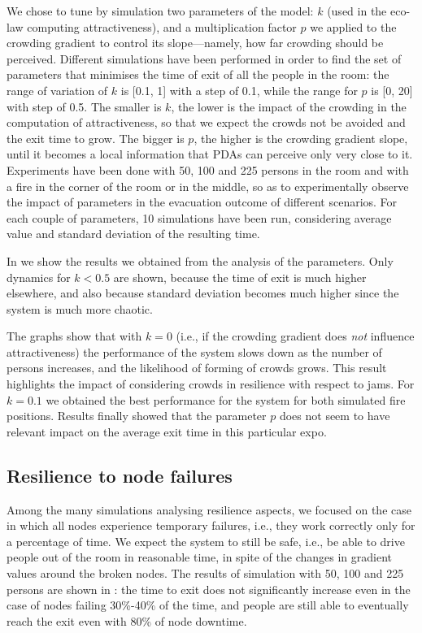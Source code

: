 \documentclass[12pt,a4paper,twoside,openright]{book}
\begin{document}
We chose to tune by simulation two parameters of the model: $k$ (used in the eco-law computing attractiveness), and a multiplication factor $p$ we applied to the crowding gradient to control its slope---namely, how far crowding should be perceived.
%
Different simulations have been performed in order to find the set of parameters that minimises the time of exit of all the people in the room: the range of variation of $k$ is [0.1, 1] with a step of 0.1, while the range for $p$ is [0, 20] with step of 0.5. 
%
The smaller is $k$, the lower is the impact of the crowding in the computation of attractiveness, so that we expect the crowds not be avoided and the exit time to grow.
%
The bigger is $p$, the higher is the crowding gradient slope, until it becomes a local information that PDAs can perceive only very close to it. 
%
Experiments have been done with 50, 100 and 225 persons in the room and with a fire in the corner of the room or in the middle, so as to experimentally observe the impact of parameters in the evacuation outcome of different scenarios.
%
For each couple of parameters, 10 simulations have been run, considering average value and standard deviation of the resulting time.

In  we show the results we obtained from the analysis of the parameters. 
%
Only dynamics for $k<0.5$ are shown, because the time of exit is much higher elsewhere, and also because standard deviation becomes much higher since the system is much more chaotic.

The graphs show that with $k=0$ (i.e., if the crowding gradient does \emph{not} influence attractiveness) the performance of the system slows down as the number of persons increases, and the likelihood of forming of crowds grows. This result highlights the impact of considering crowds in resilience with respect to jams.
%
For $k = 0.1$ we obtained the best performance for the system for both  simulated fire positions. Results finally showed that the parameter $p$ does not seem to have relevant impact on the average exit time in this particular expo.

\subsection{Resilience to node failures}

Among the many simulations analysing resilience aspects, we focused on the case in which all nodes experience temporary failures, i.e., they  work correctly only for a percentage of time.
%
We expect the system to still be safe, i.e., be able to drive people out of the room in reasonable time, in spite of the changes in gradient values around the broken nodes. 
%
The results of simulation with 50, 100 and 225 persons are shown in : the time to exit does not significantly increase even in the case of nodes failing 30\%-40\% of the time, and people are still able to eventually reach the exit even with 80\% of node downtime.
\end{document}
